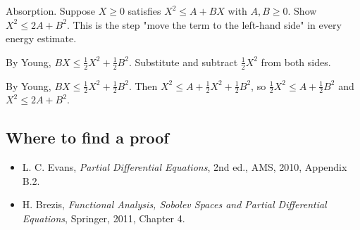\begin{exercise}
  Absorption. Suppose $X \ge 0$ satisfies $X^2 \le A + BX$ with $A, B \ge 0$. Show $X^2 \le 2A + B^2$. This is the step "move the term to the left-hand side" in every energy estimate.
  \begin{hint}
    By Young, $BX \le \frac12 X^2 + \frac12 B^2$. Substitute and subtract $\frac12 X^2$ from both sides.
  \end{hint}
  \begin{solution}
    By Young, $BX \le \frac12X^2 + \frac12B^2$. Then $X^2 \le A + \frac12X^2 + \frac12B^2$, so $\frac12X^2 \le A + \frac12B^2$ and $X^2 \le 2A + B^2$.
  \end{solution}
\end{exercise}

\subsection*{Where to find a proof}

\begin{itemize}
\item L. C. Evans, \emph{Partial Differential Equations}, 2nd ed., AMS, 2010, Appendix B.2.
\item H. Brezis, \emph{Functional Analysis, Sobolev Spaces and Partial Differential Equations}, Springer, 2011, Chapter 4.
\end{itemize}

